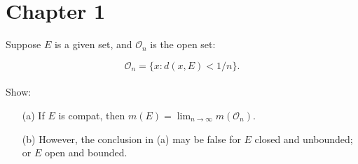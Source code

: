 \documentclass[12pt, a4paper, openany, twoside]{book}
\theoremstyle{definition}
\theoremstyle{remark}
\theoremstyle{plain}
\numberwithin{equation}{section}
\begin{document}
\section{Chapter 1}
\begin{tcolorbox}[colback=yellow!10!white,colframe=gray!75!black,title=Exercise 1.5]\label{Exercise 1.5}
    Suppose $E$ is a given set, and $\mathcal{O}_n$ is the open set:

    \[\mathcal{O}_n=\{x:d(x,E)<1/n\}.\]
    \\
    Show:
    \begin{enumerate}
        \item [(a)] If $E$ is compat, then $m(E)=\lim_{n\rightarrow\infty}{m(\mathcal{O}_n)}$.
        \item [(b)] However, the conclusion in (a) may be false for $E$ closed and unbounded; or $E$ open and bounded.
    \end{enumerate}
\end{tcolorbox}
\end{document}
